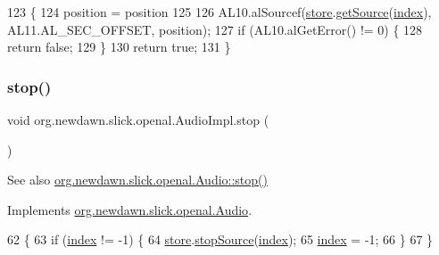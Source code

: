 \begin{DoxyCode}
123                                                \{
124         position = position %
125         
126         AL10.alSourcef(\mbox{\hyperlink{classorg_1_1newdawn_1_1slick_1_1openal_1_1_audio_impl_a1f616264ac2d6ec44cb0c187836d34f5}{store}}.\mbox{\hyperlink{classorg_1_1newdawn_1_1slick_1_1openal_1_1_sound_store_a36b83b67fccef1cd5167d2ea11e89f6a}{getSource}}(\mbox{\hyperlink{classorg_1_1newdawn_1_1slick_1_1openal_1_1_audio_impl_ab0e80c9c431d4b6c9b667012f7f71b86}{index}}), AL11.AL\_SEC\_OFFSET, position);
127         \textcolor{keywordflow}{if} (AL10.alGetError() != 0) \{
128             \textcolor{keywordflow}{return} \textcolor{keyword}{false};
129         \}
130         \textcolor{keywordflow}{return} \textcolor{keyword}{true};
131     \}
\end{DoxyCode}
\mbox{\label{classorg_1_1newdawn_1_1slick_1_1openal_1_1_audio_impl_a8ad896e19c35a9d3d1d93e52685158ff}} 
\subsubsection{\texorpdfstring{stop()}{stop()}}
{\footnotesize\ttfamily void org.\+newdawn.\+slick.\+openal.\+Audio\+Impl.\+stop (\begin{DoxyParamCaption}{ }\end{DoxyParamCaption})\hspace{0.3cm}{\ttfamily [inline]}}

\begin{DoxySeeAlso}{See also}
\mbox{\hyperlink{interfaceorg_1_1newdawn_1_1slick_1_1openal_1_1_audio_a8346ca83b84cb6605efb695462f12337}{org.\+newdawn.\+slick.\+openal.\+Audio\+::stop()}} 
\end{DoxySeeAlso}


Implements \mbox{\hyperlink{interfaceorg_1_1newdawn_1_1slick_1_1openal_1_1_audio_a8346ca83b84cb6605efb695462f12337}{org.\+newdawn.\+slick.\+openal.\+Audio}}.


\begin{DoxyCode}
62                        \{
63         \textcolor{keywordflow}{if} (\mbox{\hyperlink{classorg_1_1newdawn_1_1slick_1_1openal_1_1_audio_impl_ab0e80c9c431d4b6c9b667012f7f71b86}{index}} != -1) \{
64             \mbox{\hyperlink{classorg_1_1newdawn_1_1slick_1_1openal_1_1_audio_impl_a1f616264ac2d6ec44cb0c187836d34f5}{store}}.\mbox{\hyperlink{classorg_1_1newdawn_1_1slick_1_1openal_1_1_sound_store_abbc79b5bafc0b1e6108e028e8232f572}{stopSource}}(\mbox{\hyperlink{classorg_1_1newdawn_1_1slick_1_1openal_1_1_audio_impl_ab0e80c9c431d4b6c9b667012f7f71b86}{index}});
65             \mbox{\hyperlink{classorg_1_1newdawn_1_1slick_1_1openal_1_1_audio_impl_ab0e80c9c431d4b6c9b667012f7f71b86}{index}} = -1;
66         \}
67     \}
\end{DoxyCode}


